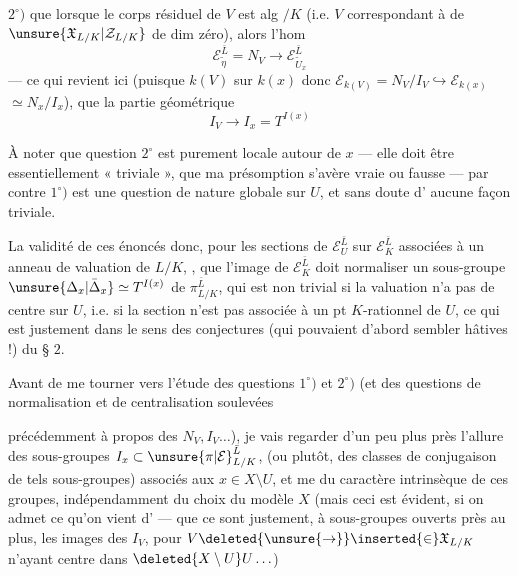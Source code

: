 $2^\circ)$ que  lorsque le corps résiduel de $V$ est alg $/K$ (i.e. $V$ correspondant à  de $\unsure{\mathfrak X_{L/K}|\mathcal Z_{L/K}}$ de dim zéro), alors l'hom
\[
 \mathcal E_{\tilde\eta}^{\bar L}=N_V\longrightarrow\mathcal E_{\tilde U_x}^{\bar L}
\]
    --- ce qui revient ici (puisque $k(V)$   sur $k(x)$ donc $\mathcal E_{k(V)}=N_V/I_V\hookrightarrow\mathcal E_{k(x)}$  $\simeq N_x/I_x$), que la partie géométrique
\[
 I_V\longrightarrow I_x=T^{I(x)}
\]
    

À noter que  question $2^\circ$ est purement
locale autour de $x$ --- elle doit être essentiellement « triviale », que ma présomption s'avère vraie ou fausse --- par contre $1^\circ)$ est une question de nature globale sur $U$, et sans doute d' aucune façon triviale.

 La validité de ces énoncés   donc, pour les sections de $\mathcal E_U^{\bar L}$ sur $\mathcal E_K^{\bar L}$ associées à un anneau de valuation de $L/K$, , que l'image de $\mathcal E_K^{\bar L}$ doit normaliser un  sous-groupe $\unsure{\Delta_x|\bar\Delta_x}\simeq T^{I(x)}$ de $\pi_{L/K}^{\bar L}$, qui est non trivial si la valuation n'a pas de centre sur $U$, i.e. si la section n'est pas associée à un pt $K$-rationnel de $U$, ce qui est justement dans le sens des conjectures (qui pouvaient d'abord sembler hâtives !) du § $2$.

Avant de me tourner vers l'étude des questions $1^\circ)$ et $2^\circ)$ (et  des questions de normalisation et de centralisation soulevées

précédemment à propos des $N_V,I_V\ldots$), je vais regarder d'un peu plus près l'allure des sous-groupes $I_x\subset\unsure{\pi|\mathcal E}_{L/K}^{\bar L}$, (ou  plutôt, des classes de \inserted{$\pi$-}conjugaison de tels sous-groupes) associés aux $x\in X\setminus U$,  et me  du caractère intrinsèque de ces groupes, indépendamment du choix du modèle $X$ (mais ceci est évident, si on admet ce qu'on vient d' --- que ce sont justement, à sous-groupes ouverts près  au plus, les images des $I_V$, pour $V\deleted{\unsure{\to}}\inserted{\in}\mathfrak X_{L/K}$ n'ayant  centre dans $\deleted{X\setminus U}U\ldots$)

